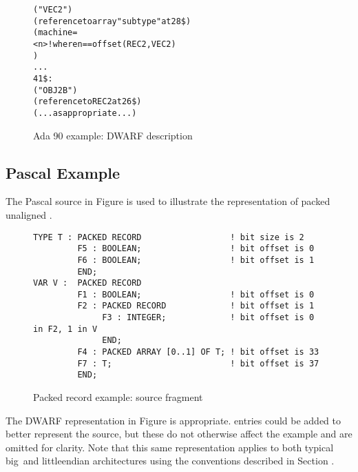 \begin{figure}[p]
\begin{dwflisting}
\begin{alltt}
            ("VEC2")
            (reference to array "subtype" at 28\$)
            (machine=
                <n> ! where n == offset(REC2, VEC2)
                )
     . . .
41\$: 
        ("OBJ2B")
        (reference to REC2 at 26\$)
        (...as appropriate...)
\end{alltt}
\end{dwflisting}
\caption{Ada 90 example: DWARF description}
\label{fig:adaexampledwarfdescription}
\end{figure}

\clearpage

\subsection{Pascal Example}
\label{app:pascalexample}
The Pascal  source in 
Figure 
is used to illustrate the representation of packed unaligned
.

\begin{figure}[here]
\begin{lstlisting}
TYPE T : PACKED RECORD                  ! bit size is 2
         F5 : BOOLEAN;                  ! bit offset is 0
         F6 : BOOLEAN;                  ! bit offset is 1
         END;
VAR V :  PACKED RECORD
         F1 : BOOLEAN;                  ! bit offset is 0
         F2 : PACKED RECORD             ! bit offset is 1
              F3 : INTEGER;             ! bit offset is 0 in F2, 1 in V
              END;
         F4 : PACKED ARRAY [0..1] OF T; ! bit offset is 33
         F7 : T;                        ! bit offset is 37
         END;
\end{lstlisting}
\caption{Packed record example: source fragment}
\label{fig:packedrecordexamplesourcefragment}
\end{figure}

The DWARF representation in 
Figure  
is appropriate. 
 entries could be added to
better represent the source, but these do not otherwise affect
the example and are omitted for clarity. Note that this same
representation applies to both typical big\dash \ and 
little\dash endian
architectures using the conventions described in 
Section .

